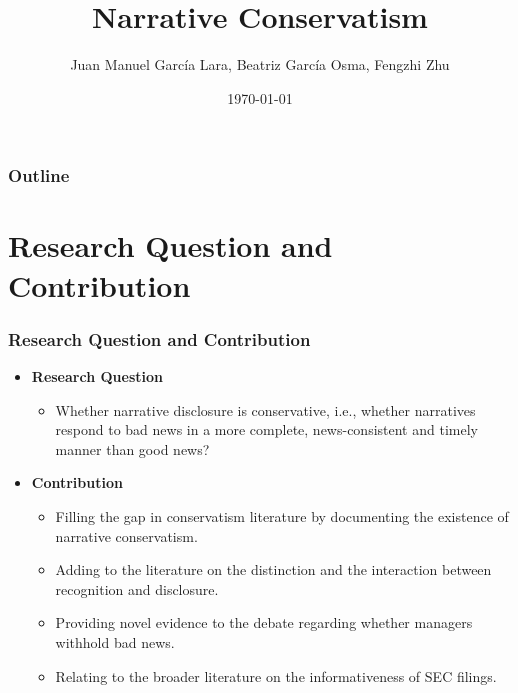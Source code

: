 \documentclass{beamer}
\title[Narrative Conservatism]{Narrative Conservatism} %
\author[]{Juan Manuel Garc\'ia Lara, Beatriz Garc\'ia Osma, Fengzhi Zhu} %
\institute[] %
{Universidad Carlos III de Madrid \\ %

	\medskip
	fzhu@emp.uc3m.es} %
\date{\today} %
\begin{document}
	
\begin{frame}
\titlepage %
\end{frame}

\begin{frame}
\frametitle{Outline}
\tableofcontents
\end{frame}

\section{Research Question and Contribution}

\begin{frame}
\frametitle{Research Question and Contribution}
\begin{itemize}
\item \textbf{Research Question}

\begin{itemize}
\item Whether narrative disclosure is conservative, i.e., whether narratives respond to bad news in a more complete, news-consistent and timely manner than good news?
\end{itemize}

\item \textbf{Contribution}

\begin{itemize}
	\item Filling the gap in conservatism literature by documenting the existence of narrative conservatism.
	\item Adding to the literature on the distinction and the interaction between recognition and disclosure.
	\item Providing novel evidence to the debate regarding whether managers withhold bad news. 
	\item Relating to the broader literature on the informativeness of SEC filings.
\end{itemize}
\end{itemize}
\end{frame}
\end{document}
